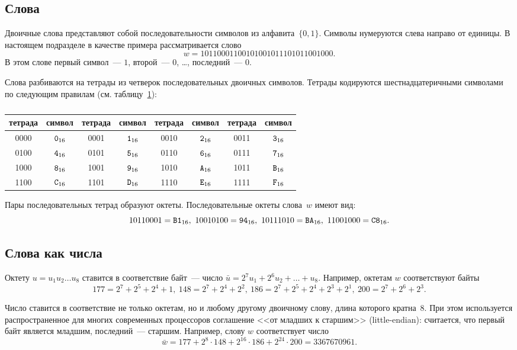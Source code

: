 \subsection{Слова}

Двоичные слова представляют собой последовательности символов из 
алфавита~$\{0,1\}$. Символы нумеруются слева направо от единицы.
%
В настоящем подразделе в качестве примера рассматривается слово
$$
w=1011 0001 1001 0100 1011 1010 1100 1000.
$$
В этом слове первый символ~--- $1$, 
второй~--- $0$, \ldots, последний~--- $0$.

Слова разбиваются на тетрады из четверок последовательных двоичных символов.
%
Тетрады кодируются шестнадцатеричными символами по следующим правилам
(см. таблицу~\ref{Table.Hex}):

\begin{table}[H]
\caption{}\label{Table.Hex}
\begin{tabular}{|c|c||c|c||c|c||c|c|}
\hline
тетрада & символ & тетрада & символ & тетрада & символ & тетрада & символ\\
\hline
\hline
0000 & $\texttt{0}_{16}$ & 0001 & $\texttt{1}_{16}$ & 
0010 & $\texttt{2}_{16}$ & 0011 & $\texttt{3}_{16}$\\
0100 & $\texttt{4}_{16}$ & 0101 & $\texttt{5}_{16}$ & 
0110 & $\texttt{6}_{16}$ & 0111 & $\texttt{7}_{16}$\\ 
1000 & $\texttt{8}_{16}$ & 1001 & $\texttt{9}_{16}$ & 
1010 & $\texttt{A}_{16}$ & 1011 & $\texttt{B}_{16}$\\ 
1100 & $\texttt{C}_{16}$ & 1101 & $\texttt{D}_{16}$ & 
1110 & $\texttt{E}_{16}$ & 1111 & $\texttt{F}_{16}$\\ 
\hline
\end{tabular}
\end{table}

Пары последовательных тетрад образуют октеты.
Последовательные октеты слова~$w$ имеют вид:
$$
1011 0001=\hex{B1},\ 
1001 0100=\hex{94},\ 
1011 1010=\hex{BA},\  
1100 1000=\hex{C8}.
$$

\subsection{Слова как числа}

Октету $u=u_1 u_2\ldots u_8$ ставится в соответствие байт~--- 
число $\bar{u}=2^7u_1+2^6 u_2+\ldots + u_8$. 
Например, октетам $w$ соответствуют байты
$$
177=2^7+2^5+2^4+1,\ 
148=2^7+2^4+2^2,\ 
186=2^7+2^5+2^4+2^3+2^1,\ 
200=2^7+2^6+2^3.
$$

Число ставится в соответствие не только октетам, но и любому другому
двоичному слову, длина которого кратна~$8$. 
%
При этом используется распространенное для многих современных 
процессоров соглашение <<от младших к старшим>> (little-endian):
считается, что первый байт является младшим, последний~--- старшим.
Например, слову $w$ соответствует число
$$
\bar{w}=177+2^{8}\cdot 148+2^{16}\cdot 186+2^{24}\cdot 200 = 3367670961.
$$

